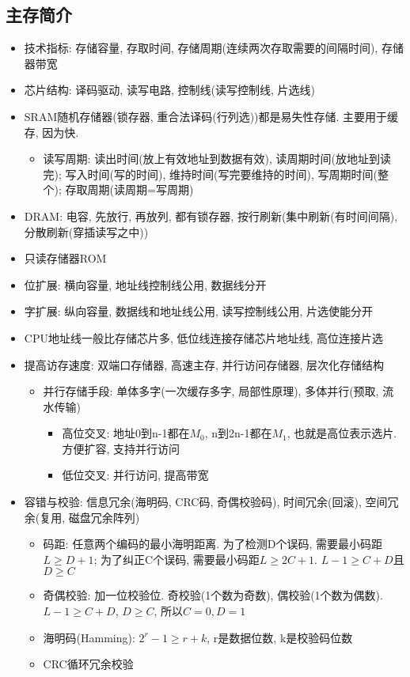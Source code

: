 \documentclass[UTF8]{article}
\begin{document}
\subsection{主存简介}
\begin{itemize}
\item 技术指标: 存储容量, 存取时间, 存储周期(连续两次存取需要的间隔时间), 存储器带宽
\item 芯片结构: 译码驱动, 读写电路, 控制线(读写控制线, 片选线)
\item SRAM随机存储器(锁存器, 重合法译码(行列选))都是易失性存储. 主要用于缓存, 因为快.
	\begin{itemize}
	\item 读写周期: 读出时间(放上有效地址到数据有效), 读周期时间(放地址到读完); 写入时间(写的时间), 维持时间(写完要维持的时间), 写周期时间(整个); 存取周期(读周期=写周期)
	\end{itemize}
\item DRAM: 电容, 先放行, 再放列, 都有锁存器, 按行刷新(集中刷新(有时间间隔), 分散刷新(穿插读写之中))
\item 只读存储器ROM
\item 位扩展: 横向容量, 地址线控制线公用, 数据线分开
\item 字扩展: 纵向容量, 数据线和地址线公用, 读写控制线公用, 片选使能分开
\item CPU地址线一般比存储芯片多, 低位线连接存储芯片地址线, 高位连接片选
\item 提高访存速度: 双端口存储器, 高速主存, 并行访问存储器, 层次化存储结构
	\begin{itemize}
	\item 并行存储手段: 单体多字(一次缓存多字, 局部性原理), 多体并行(预取, 流水传输)
		\begin{itemize}
		\item 高位交叉: 地址0到n-1都在$M_0$, n到2n-1都在$M_1$, 也就是高位表示选片. 方便扩容, 支持并行访问
		\item 低位交叉: 并行访问, 提高带宽
		\end{itemize}
	\end{itemize}
\item 容错与校验: 信息冗余(海明码, CRC码, 奇偶校验码), 时间冗余(回滚), 空间冗余(复用, 磁盘冗余阵列)
	\begin{itemize}
	\item 码距: 任意两个编码的最小海明距离. 为了检测D个误码, 需要最小码距$L\ge D+1$; 为了纠正C个误码, 需要最小码距$L\ge 2C+1$. $L-1\ge C+D$且$D\ge C$
	\item 奇偶校验: 加一位校验位. 奇校验(1个数为奇数), 偶校验(1个数为偶数). $L-1\ge C+D$, $D\ge C$, 所以$C=0, D=1$
	\item 海明码(Hamming): $2^r-1\ge r+k$, r是数据位数, k是校验码位数
	\item CRC循环冗余校验
	\end{itemize}
\end{itemize}
\end{document}
